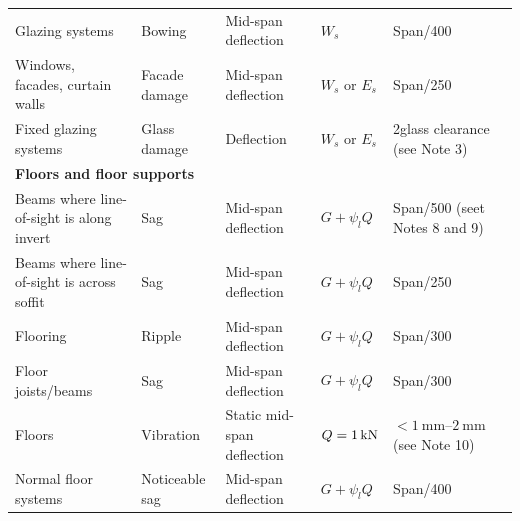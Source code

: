 \begin{table}
\begin{tabular}{lllll}
	Glazing systems                                                  & Bowing                                & Mid-span deflection               & $W_s$                       & Span/400                                      \\
	Windows, facades, curtain walls                                  & Facade damage                         & Mid-span deflection               & $W_s$ or $E_s$              & Span/250                                      \\
	Fixed glazing systems                                            & Glass damage                          & Deflection                        & $W_s$ or $E_s$              & 2\texttimes{}glass clearance (see Note 3)     \\ \midrule
	\multicolumn{5}{l}{\textbf{Floors and floor supports}}                                                                                                                                                                     \\ \midrule
	Beams where line-of-sight is along invert                        & Sag                                   & Mid-span deflection               & $G+\psi_lQ$                 & Span/500 (seet Notes 8 and 9)                 \\
	Beams where line-of-sight is across soffit                       & Sag                                   & Mid-span deflection               & $G+\psi_lQ$                 & Span/250                                      \\
	Flooring                                                         & Ripple                                & Mid-span deflection               & $G+\psi_lQ$                 & Span/300                                      \\
	Floor joists/beams                                               & Sag                                   & Mid-span deflection               & $G+\psi_lQ$                 & Span/300                                      \\
	Floors                                                           & Vibration                             & Static mid-span deflection        & $Q=\SI{1}{\kilo\newton}$             & $<\qtyrange{1}{2}{\mm}$ (see Note 10)         \\
	Normal floor systems                                             & Noticeable sag                        & Mid-span deflection               & $G+\psi_lQ$                 & Span/400                                      \\

\end{tabular}
\end{table}
